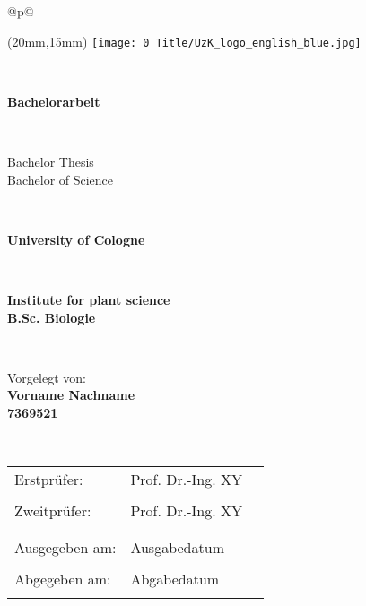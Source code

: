 \begin{center}
    \begin{tabular}{@{}p{\textwidth}@{}}

\begin{textblock*}{50mm}(20mm,15mm)
\texttt{[image: 0 Title/UzK\_logo\_english\_blue.jpg]}
\end{textblock*}
\\
\vspace*{1cm}

\begin{center}
\LARGE{\textbf{Bachelorarbeit}}
\end{center}
\\

\begin{center}
\large{Bachelor Thesis\\ \vspace{3mm} Bachelor of Science} \\
\end{center}

\\
\begin{center}
\textbf{\Huge{University of Cologne}}
\end{center}
\\
\begin{center}
\large{\textbf{Institute for plant science\\ \vspace{2mm} B.Sc. Biologie}} 
\end{center}
\\

\begin{center}
\large{Vorgelegt von:\\ \textbf{Vorname Nachname}} \\
\large{\textbf{7369521}}\\
\end{center}

\\

\begin{center}
\begin{tabular}{lll}
\large{Erstprüfer:} & \large Prof. Dr.-Ing. XY\\
\\
\large{Zweitprüfer:} & \large Prof. Dr.-Ing. XY\\
\\
\\
\large{Ausgegeben am:}  & \large Ausgabedatum\\
\\
\large{Abgegeben am:}  & \large Abgabedatum\\
\\
\end{tabular}
\end{center}

\end{tabular}
\end{center}
